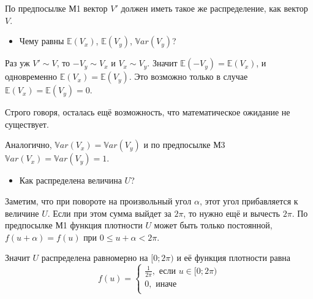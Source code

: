 \documentclass[11pt,russian,]{article}
\providecommand{\tightlist}{%
  \setlength{\itemsep}{0pt}\setlength{\parskip}{0pt}}
\newcommand{\E}{\mathbb{E}}
\newcommand{\Var}{\mathbb{V}ar}
\begin{document}
По предпосылке М1 вектор \(V'\) должен иметь такое же распределение, как
вектор \(V\).

\begin{itemize}
\tightlist
\item
  Чему равны \(\E(V_x)\), \(\E(V_y)\), \(\Var(V_y)\)?
\end{itemize}

Раз уж \(V' \sim V\), то \(-V_y \sim V_x\) и \(V_x \sim V_y\). Значит
\(\E(-V_y) = \E(V_x)\), и одновременно \(\E(V_x) = \E(V_y)\). Это
возможно только в случае \(\E(V_x) = \E(V_y) = 0\).

Строго говоря, осталась ещё возможность, что математическое ожидание не
существует.

Аналогично, \(\Var(V_x) = \Var(V_y)\) и по предпосылке М3
\(\Var(V_x) = \Var(V_y) = 1\).

\begin{itemize}
\tightlist
\item
  Как распределена величина \(U\)?
\end{itemize}

Заметим, что при повороте на произвольный угол \(\alpha\), этот угол
прибавляется к величине \(U\). Если при этом сумма выйдет за \(2\pi\),
то нужно ещё и вычесть \(2\pi\). По предпосылке М1 функция плотности
\(U\) может быть только постоянной, \(f(u+\alpha)=f(u)\) при
\(0\leq u +\alpha < 2\pi\).

Значит \(U\) распределена равномерно на \([0;2\pi)\) и её функция
плотности равна \[
f(u) = \begin{cases}
\frac{1}{2\pi}, \text{ если } u \in [0;2\pi) \\
0, \text{ иначе} \\
\end{cases}
\]

\printbibliography
\end{document}
